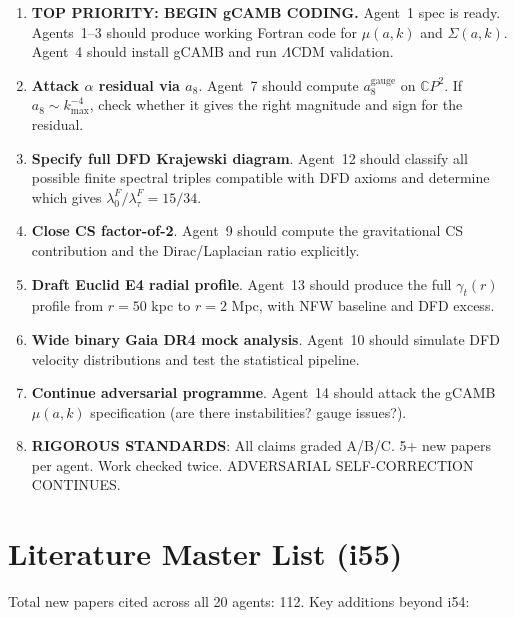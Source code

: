 \documentclass[11pt,a4paper]{article}
\newcommand{\CP}{\mathbb{C}P}
\begin{document}
\begin{enumerate}
\item \textbf{TOP PRIORITY: BEGIN gCAMB CODING.} Agent~1 spec is ready. Agents~1--3 should produce working Fortran code for $\mu(a,k)$ and $\Sigma(a,k)$. Agent~4 should install gCAMB and run $\Lambda$CDM validation.
\item \textbf{Attack $\alpha$ residual via $a_8$}. Agent~7 should compute $a_8^{\mathrm{gauge}}$ on $\CP^2$. If $a_8 \sim k_{\max}^{-4}$, check whether it gives the right magnitude and sign for the residual.
\item \textbf{Specify full DFD Krajewski diagram}. Agent~12 should classify all possible finite spectral triples compatible with DFD axioms and determine which gives $\lambda_0^F/\lambda_\tau^F = 15/34$.
\item \textbf{Close CS factor-of-2}. Agent~9 should compute the gravitational CS contribution and the Dirac/Laplacian ratio explicitly.
\item \textbf{Draft Euclid E4 radial profile}. Agent~13 should produce the full $\gamma_t(r)$ profile from $r = 50$ kpc to $r = 2$ Mpc, with NFW baseline and DFD excess.
\item \textbf{Wide binary Gaia DR4 mock analysis}. Agent~10 should simulate DFD velocity distributions and test the statistical pipeline.
\item \textbf{Continue adversarial programme}. Agent~14 should attack the gCAMB $\mu(a,k)$ specification (are there instabilities? gauge issues?).
\item \textbf{RIGOROUS STANDARDS}: All claims graded A/B/C. 5+ new papers per agent. Work checked twice. ADVERSARIAL SELF-CORRECTION CONTINUES.
\end{enumerate}


\section{Literature Master List (i55)}
\label{sec:literature}

Total new papers cited across all 20 agents: 112. Key additions beyond i54:
\end{document}
